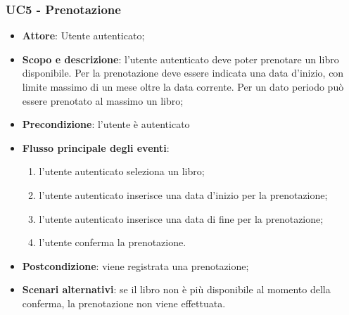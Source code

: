 \subsubsection{UC5 - Prenotazione}
\begin{itemize}
	\item \textbf{Attore}: Utente autenticato;
	\item \textbf{Scopo e descrizione}: l'utente autenticato deve poter prenotare un libro disponibile. Per la prenotazione deve essere indicata una data d'inizio, con limite massimo di un mese oltre la data corrente. Per un dato periodo può essere prenotato al massimo un libro;
	\item \textbf{Precondizione}: l'utente è autenticato
	\item \textbf{Flusso principale degli eventi}:
	\begin{enumerate}
		\item l'utente autenticato seleziona un libro;
		\item l'utente autenticato inserisce una data d'inizio per la prenotazione;
		\item l'utente autenticato inserisce una data di fine per la prenotazione;
		\item l'utente conferma la prenotazione.
	\end{enumerate} 
	\item \textbf{Postcondizione}: viene registrata una prenotazione;
	\item \textbf{Scenari alternativi}: se il libro non è più disponibile al momento della conferma, la prenotazione non viene effettuata.
\end{itemize}


